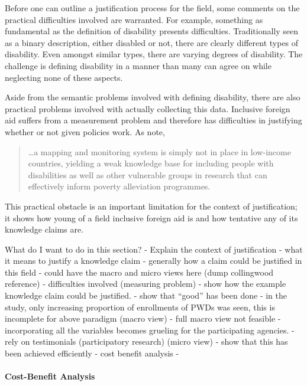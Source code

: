 \documentclass[a4paper]{article}
\begin{document}
Before one can outline a justification process for the field, some comments on
the practical difficulties involved are warranted.  For example, something as
fundamental as the definition of disability presents difficulties.
Traditionally seen as a binary description, either disabled or not, there are
clearly different types of disability. Even amongst similar types, there are
varying degrees of disability. The challenge is defining disability in a
manner than many can agree on while neglecting none of these aspects.

Aside from the semantic problems involved with defining disability, there are
also practical problems involved with actually collecting this data.
Inclusive foreign aid suffers from a measurement problem and therefore has
difficulties in justifying whether or not given policies work. As
\cite{ingstad2011disability} note, 
%
\begin{quote} 
    \ldots a mapping and monitoring system is simply not in place in
    low-income countries, yielding a weak knowledge base for including people
    with disabilities as well as other vulnerable groups in research that can
    effectively inform poverty alleviation programmes.  
\end{quote}
%
This practical obstacle is an important limitation for the context of
justification; it shows how young of a field inclusive foreign aid is and how
tentative any of its knowledge claims are.


What do I want to do in this section?
- Explain the context of justification 
    - what it means to justify a knowledge claim
    - generally how a claim could be justified in this field
        - could have the macro and micro views here (dump collingwood
          reference)
        - difficulties involved (measuring problem)
- show how the example knowledge claim could be justified.
    - show that ``good'' has been done
        - in the study, only increasing proportion of enrollments of PWDs was
          seen, this is incomplete for above paradigm (macro view)
            - full macro view not feasible
                - incorporating all the variables becomes grueling for the
                participating agencies.
        - rely on testimonials (participatory research) (micro view)
    - show that this has been achieved efficiently
        - cost benefit analysis
-   
    





\paragraph{Cost-Benefit Analysis} 
\end{document}
